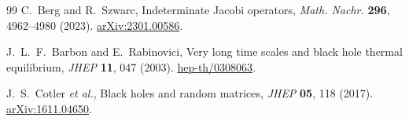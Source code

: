 \documentclass[10pt]{article}
\theoremstyle{definition}
\begin{document}
\begin{thebibliography}{99}
C.~Berg and R.~Szwarc,
Indeterminate Jacobi operators,
\emph{Math. Nachr.} \textbf{296}, 4962--4980 (2023).
\href{https://arxiv.org/abs/2301.00586}{arXiv:2301.00586}.

J.~L.~F.~Barbon and E.~Rabinovici,
Very long time scales and black hole thermal equilibrium,
\emph{JHEP} \textbf{11}, 047 (2003).
\href{https://arxiv.org/abs/hep-th/0308063}{hep-th/0308063}.

J.~S.~Cotler \emph{et al.},
Black holes and random matrices,
\emph{JHEP} \textbf{05}, 118 (2017).
\href{https://arxiv.org/abs/1611.04650}{arXiv:1611.04650}.

\end{thebibliography}
\end{document}
